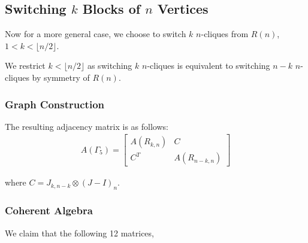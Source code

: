 

\newpage
\subsection{Switching \texorpdfstring{$k$}{k} Blocks of \texorpdfstring{$n$}{n} Vertices}
Now for a more general case, we choose to switch $k$ $n$-cliques from $R(n)$, $1<k<\lfloor n/2\rfloor$. 

\begin{remark}
    We restrict $k < \lfloor n/2 \rfloor$ as switching $k$ $n$-cliques is equivalent to switching $n-k$ $n$-cliques by symmetry of $R(n)$.
\end{remark}

\subsubsection{Graph Construction}
The resulting adjacency matrix is as follows:
\begin{align*}
     A(\Gamma_5) = \begin{bmatrix}
        A(R_{k,n}) & C \\
        C^T & A(R_{n-k, n})
    \end{bmatrix}
\end{align*}

where $C = J_{k, n-k} \otimes (J-I)_n$.

\subsubsection{Coherent Algebra}
We claim that the following 12 matrices,

